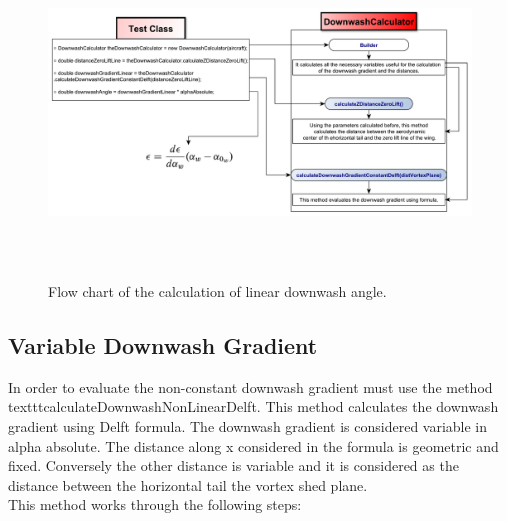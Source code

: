 \begin{figure}[H]
\centering
{\includegraphics[height=8cm]{Immagini/linearDownwash_2.pdf}} 
\caption{Flow chart of the calculation of linear downwash angle.}
\label{flowchartangles}
\end{figure} 



\subsection{Variable Downwash Gradient}

In order to evaluate the non-constant downwash gradient must use the method texttt{calculateDownwashNonLinearDelft}. 
This method calculates the downwash gradient using Delft formula. The downwash gradient is considered variable in alpha absolute. The distance along x considered in the formula is geometric and fixed. Conversely the other distance is variable and it is considered as the distance between the horizontal tail the vortex shed plane. \\
This method works through the following steps:

